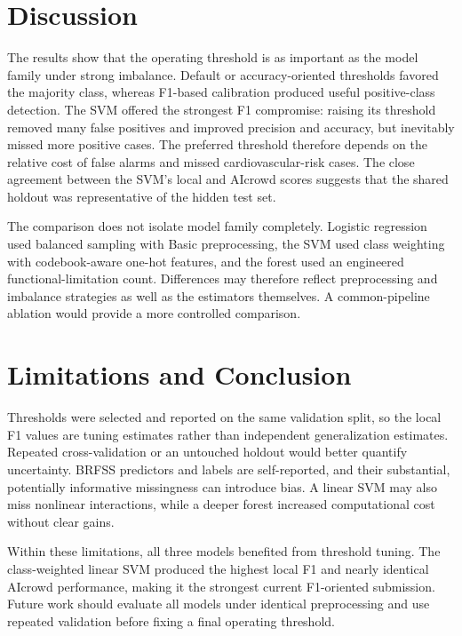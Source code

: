 \documentclass[10pt,a4paper]{article}
\begin{document}
\section{Discussion}

The results show that the operating threshold is as important as the model
family under strong imbalance. Default or accuracy-oriented thresholds favored
the majority class, whereas F1-based calibration produced useful positive-class
detection. The SVM offered the strongest F1 compromise: raising its threshold
removed many false positives and improved precision and accuracy, but inevitably
missed more positive cases. The preferred threshold therefore depends on the
relative cost of false alarms and missed cardiovascular-risk cases. The close
agreement between the SVM's local and AIcrowd scores suggests that the shared
holdout was representative of the hidden test set.

The comparison does not isolate model family completely. Logistic regression
used balanced sampling with Basic preprocessing, the SVM used class weighting
with codebook-aware one-hot features, and the forest used an engineered
functional-limitation count. Differences may therefore reflect preprocessing
and imbalance strategies as well as the estimators themselves. A common-pipeline
ablation would provide a more controlled comparison.

\section{Limitations and Conclusion}

Thresholds were selected and reported on the same validation split, so the
local F1 values are tuning estimates rather than independent generalization
estimates. Repeated cross-validation or an untouched holdout would better
quantify uncertainty. BRFSS predictors and labels are self-reported, and their
substantial, potentially informative missingness can introduce bias. A linear
SVM may also miss nonlinear interactions, while a deeper forest increased
computational cost without clear gains.

Within these limitations, all three models benefited from threshold tuning.
The class-weighted linear SVM produced the highest local F1 and nearly identical
AIcrowd performance, making it the strongest current F1-oriented submission.
Future work should evaluate all models under identical preprocessing and use
repeated validation before fixing a final operating threshold.
\end{document}

